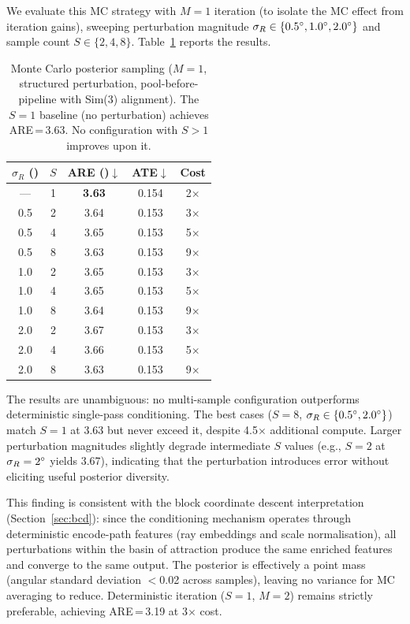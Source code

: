 We evaluate this MC strategy with $M=1$ iteration (to isolate the MC effect from iteration gains), sweeping perturbation magnitude $\sigma_R \in \{0.5\degree{}, 1.0\degree{}, 2.0\degree{}\}$ and sample count $S \in \{2, 4, 8\}$. Table~\ref{tab:mc_sampling} reports the results.

\begin{table}[h]
\centering
\caption{Monte Carlo posterior sampling ($M=1$, structured perturbation, pool-before-pipeline with Sim(3) alignment). The $S=1$ baseline (no perturbation) achieves ARE\,=\,3.63\degree{}. No configuration with $S > 1$ improves upon it.}
\label{tab:mc_sampling}
\begin{tabular}{@{}ccccc@{}}
\toprule
$\sigma_R$ (\degree{}) & $S$ & ARE (\degree{})$\downarrow$ & ATE$\downarrow$ & Cost \\
\midrule
--- & 1 & \textbf{3.63} & 0.154 & 2$\times$ \\
\midrule
0.5 & 2 & 3.64 & 0.153 & 3$\times$ \\
0.5 & 4 & 3.65 & 0.153 & 5$\times$ \\
0.5 & 8 & 3.63 & 0.153 & 9$\times$ \\
1.0 & 2 & 3.65 & 0.153 & 3$\times$ \\
1.0 & 4 & 3.65 & 0.153 & 5$\times$ \\
1.0 & 8 & 3.64 & 0.153 & 9$\times$ \\
2.0 & 2 & 3.67 & 0.153 & 3$\times$ \\
2.0 & 4 & 3.66 & 0.153 & 5$\times$ \\
2.0 & 8 & 3.63 & 0.153 & 9$\times$ \\
\bottomrule
\end{tabular}
\end{table}

The results are unambiguous: no multi-sample configuration outperforms deterministic single-pass conditioning. The best cases ($S=8$, $\sigma_R \in \{0.5\degree{}, 2.0\degree{}\}$) match $S=1$ at 3.63\degree{} but never exceed it, despite 4.5$\times$ additional compute. Larger perturbation magnitudes slightly degrade intermediate $S$ values (e.g., $S=2$ at $\sigma_R=2\degree{}$ yields 3.67\degree{}), indicating that the perturbation introduces error without eliciting useful posterior diversity.

This finding is consistent with the block coordinate descent interpretation (Section~\ref{sec:bcd}): since the conditioning mechanism operates through deterministic encode-path features (ray embeddings and scale normalisation), all perturbations within the basin of attraction produce the same enriched features and converge to the same output. The posterior is effectively a point mass (angular standard deviation $<$0.02\degree{} across samples), leaving no variance for MC averaging to reduce. Deterministic iteration ($S=1$, $M=2$) remains strictly preferable, achieving ARE\,=\,3.19\degree{} at 3$\times$ cost.

